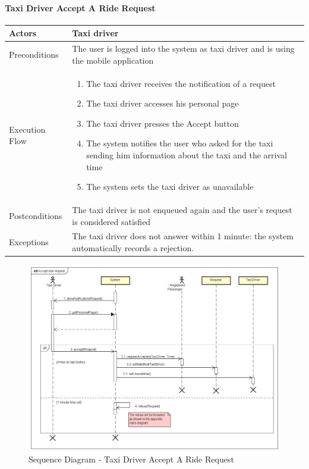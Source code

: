 \paragraph{Taxi Driver Accept A Ride Request}
\begin{center}
	\begin{tabular}{ | l | p{8cm} |}
		\hline Actors & Taxi driver
		\\ \hline
		Preconditions &
		The user is logged into the system as taxi driver and is using the mobile application
		\\ \hline
		Execution Flow &
		\begin{enumerate}
			\item The taxi driver receives the notification of a request
			\item The taxi driver accesses his personal page
			\item The taxi driver presses the Accept button
			\item The system notifies the user who asked for the taxi sending him
			information about the taxi and the arrival time
			\item The system sets the taxi driver as unavailable
		\end{enumerate}
		\\ \hline
		Postconditions & The taxi driver is not enqueued again and the user's request
		is considered satisfied
		\\ \hline
		Exceptions &
		The taxi driver does not answer within 1 minute:
		the system automatically records a rejection.
		\\ \hline
	\end{tabular}
\end{center}
\newpage
\begin{landscape}
\begin{figure}[!h]
	\begin{center}			
		\includegraphics[height=\textheight]{../SE2_SD/AcceptRideRequest}
		\caption{Sequence Diagram - Taxi Driver Accept A Ride Request}	
	\end{center}
\end{figure}
\end{landscape}
\newpage

